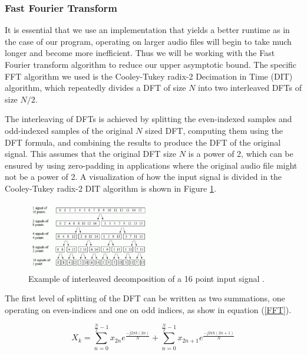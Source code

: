 \documentclass[journal]{IEEEtran}
\begin{document}
\subsubsection{Fast Fourier Transform}
	\par {
		It is essential that we use an implementation that yields a 
		better runtime as in the case of our program, operating on 
		larger audio files will begin to take much longer and become more 
		inefficient. Thus we will be working with the 
		Fast Fourier transform algorithm to reduce our upper 
		asymptotic bound. The specific FFT algorithm we used is the Cooley-Tukey 
		radix-2 Decimation in Time (DIT) algorithm, which repeatedly divides a 
		DFT of size $N$ into two interleaved DFTs of size $N / 2$.
	}
	\par{
		The interleaving of DFTs is achieved by splitting the even-indexed samples
		and odd-indexed samples of the original $N$ sized DFT, computing them using
		the DFT formula, and combining the results to produce the DFT of the 
		original signal. This assumes that the original DFT size $N$ is a 
		power of 2, which can be ensured by using zero-padding in applications 
		where the original audio file might not be a power of 2.
		A visualization of how the input signal is divided in the Cooley-Tukey
		radix-2 DIT algorithm is shown in Figure \ref{fig:dft-decomp}.
	}
	\begin{figure}[h]
		\centering
		\includegraphics[width=0.5\textwidth]{dft-decomp}
		\caption{Example of interleaved decomposition of a 16 point input signal
		\cite{DspGuide}.}
		\label{fig:dft-decomp}
	\end{figure}

	\par{
		The first level of splitting of the DFT
		can be written as two summations, one
		operating on even-indices and one on 
		odd indices, as show in equation (\ref{FFT}).

		\begin{equation}\label{FFT}
			\displaystyle X_k = \sum_{n=0}^{\frac{N}{2} - 1}x_{2n}e^{\displaystyle\frac{-j2\pi k(2n)}{N}}
			+ \sum_{n=0}^{\frac{N}{2} - 1}x_{2n + 1}e^{\displaystyle\frac{-j2\pi k(2n + 1)}{N}}
		\end{equation}
	}
\end{document}
